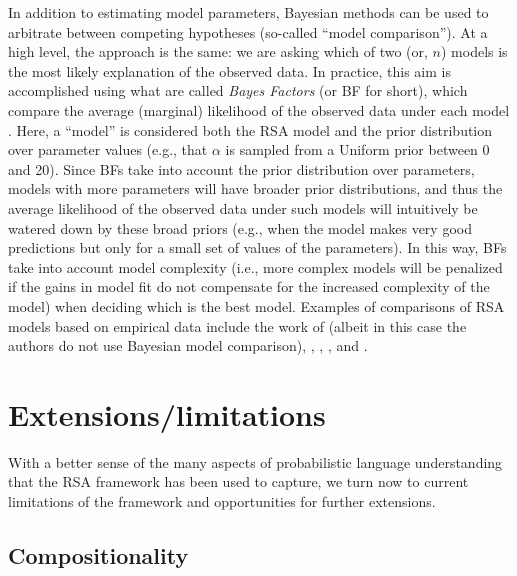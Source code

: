 \documentclass{sp}
\newcommand{\mf}[1]{\textcolor{orange}{[mf: #1]}}
\newcommand{\mht}[1]{\textcolor{purple}{[mht: #1]}}
\begin{document}
In addition to estimating model parameters, Bayesian methods can be used to arbitrate between competing hypotheses (so-called ``model comparison''). At a high level, the approach is the same: we are asking which of two (or, $n$) models is the most likely explanation of the observed data. In practice, this aim is accomplished using what are called \emph{Bayes Factors} (or BF for short), which compare the average (marginal) likelihood of the observed data under each model \citep{Jeffreys1961:Theory-of-Proba,KassRaftery1995:Bayes-Factors}. Here, a ``model'' is considered both the RSA model and the prior distribution over parameter values (e.g., that $\alpha$ is sampled from a Uniform prior between 0 and 20). Since BFs take into account the prior distribution over parameters, models with more parameters will have broader prior distributions, and thus the average likelihood of the observed data under such models will intuitively be  watered down by these broad priors (e.g., when the model makes very good predictions but only for a small set of values of the parameters). In this way, BFs take into account model complexity (i.e., more complex models will be penalized if the gains in model fit do not compensate for the increased complexity of the model) when deciding which is the best model.
Examples of comparisons of RSA models based on empirical data include the work of \citet{PottsLassiter2016:Embedded-implic} (albeit in this case the authors do not use Bayesian model comparison), \citet{qingfranke2015}, \citet{FrankeBergen2020:Theory-driven-s}, \citet{yoonetal2020}, and \cite{bohn2019predicting}.



\section{Extensions/limitations} \label{limitations}

With a better sense of the many aspects of probabilistic language understanding that the RSA framework has been used to capture, we turn now to current limitations of the framework and opportunities for further extensions.

\subsection{Compositionality}
\end{document}
